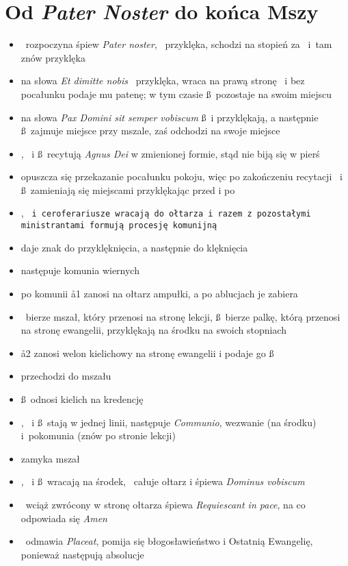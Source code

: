\section{Od \textit{Pater Noster} do końca Mszy}

\begin{itemize}
	\item \ii~rozpoczyna śpiew \textit{Pater noster}, \dd~przyklęka,
		schodzi na stopień za \ii~i tam znów przyklęka
	\item na słowa \textit{Et dimitte nobis} \dd~przyklęka, wraca na prawą
		stronę \ii~i bez pocałunku podaje mu patenę; w tym czasie
		\ss~pozostaje na swoim miejscu
	\item na słowa \textit{Pax Domini sit semper vobiscum} \ss~i  przyklękają, a
		następnie \ss~zajmuje miejsce przy mszale,  zaś odchodzi na
		swoje miejsce
	\item \ii, \dd~i \ss~recytują \textit{Agnus Dei} w zmienionej formie,
		stąd nie biją się w pierś
	\item opuszcza się przekazanie pocałunku pokoju, więc po zakończeniu
		recytacji \dd~i \ss~zamieniają się miejscami przyklękając przed i
		po
	\item {}, \tt~i ceroferariusze wracają do ołtarza i razem z pozostałymi
		ministrantami formują procesję komunijną
	\item {} daje znak do przyklęknięcia, a następnie do klęknięcia
	\item następuje komunia wiernych
	\item po komunii \aa1 zanosi na ołtarz ampułki, a po ablucjach je zabiera
	\item \dd~bierze mszał, który przenosi na stronę lekcji, \ss~bierze palkę,
		którą przenosi na stronę ewangelii, przyklękają na środku na
		swoich stopniach
	\item \aa2 zanosi welon kielichowy na stronę ewangelii i podaje go \ss
	\item {} przechodzi do mszału
	\item \ss~odnosi kielich na kredencję
	\item \ii, \dd~i \ss~stają w jednej linii, następuje \textit{Communio},
		wezwanie (na środku) i pokomunia (znów po stronie lekcji)
	\item {} zamyka mszał
	\item \ii, \dd~i \ss~wracają na środek, \ii~całuje ołtarz i śpiewa
		\textit{Dominus vobiscum}
	\item \dd~wciąż zwrócony w stronę ołtarza śpiewa \textit{Requiescant in
		pace}, na co odpowiada się \textit{Amen}
	\item \ii~odmawia \textit{Placeat}, pomija się błogosławieństwo i Ostatnią
		Ewangelię, ponieważ następują absolucje
\end{itemize}

